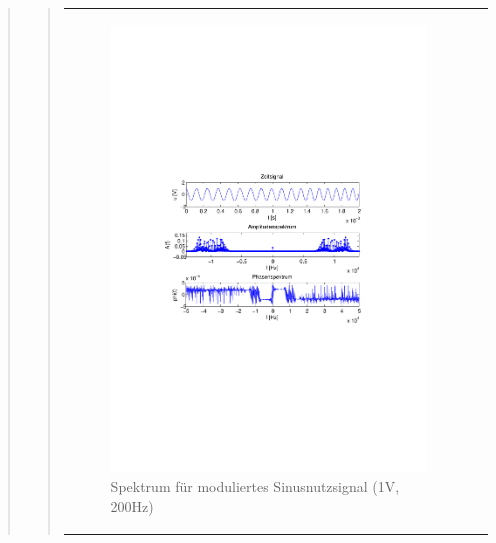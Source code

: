 \begin{quote}
\begin{quote}
\begin{center}
\begin{tabular}{ll}
\begin{minipage}{0.6\textwidth}
                \end{minipage}
                \begin{minipage}{0.6\textwidth}

                     \begin{figure}[H]
                        \label{fig:}
                        \includegraphics[scale=0.5, trim = 2cm 6.5cm 1.5cm
                        8.5cm, clip]{./Bilder/sin_a1_f200}
                        \caption{Spektrum für moduliertes Sinusnutzsignal (1V,
                        200Hz)}
                    \end{figure}
               \vspace{-1.5em}

                \end{minipage}


\end{tabular}
\end{center}
\end{quote}
\end{quote}
